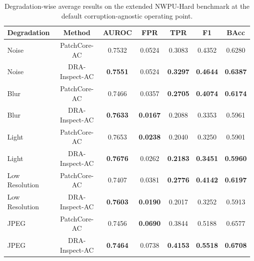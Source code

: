 \documentclass[remotesensing,article,submit,pdftex,moreauthors]{Definitions/mdpi}
\begin{document}
\begin{table}[!htbp]
\caption{Degradation-wise average results on the extended NWPU-Hard benchmark at the default corruption-agnostic operating point.}
\label{tab:nwpu-degradation-wise-appendix}
\centering
\scriptsize
\setlength{\tabcolsep}{3.5pt}
\begin{tabular}{lcccccc}
\hline
Degradation & Method & AUROC & FPR & TPR & F1 & BAcc \\
\hline
Noise & PatchCore-AC & 0.7532 & 0.0524 & 0.3083 & 0.4352 & 0.6280 \\
Noise & DRA-Inspect-AC & \textbf{0.7551} & 0.0524 & \textbf{0.3297} & \textbf{0.4644} & \textbf{0.6387} \\
Blur & PatchCore-AC & 0.7466 & 0.0357 & \textbf{0.2705} & \textbf{0.4074} & \textbf{0.6174} \\
Blur & DRA-Inspect-AC & \textbf{0.7633} & \textbf{0.0167} & 0.2088 & 0.3353 & 0.5961 \\
Light & PatchCore-AC & 0.7653 & \textbf{0.0238} & 0.2040 & 0.3250 & 0.5901 \\
Light & DRA-Inspect-AC & \textbf{0.7676} & 0.0262 & \textbf{0.2183} & \textbf{0.3451} & \textbf{0.5960} \\
Low Resolution & PatchCore-AC & 0.7407 & 0.0381 & \textbf{0.2776} & \textbf{0.4142} & \textbf{0.6197} \\
Low Resolution & DRA-Inspect-AC & \textbf{0.7603} & \textbf{0.0190} & 0.2017 & 0.3252 & 0.5913 \\
JPEG & PatchCore-AC & 0.7456 & \textbf{0.0690} & 0.3844 & 0.5188 & 0.6577 \\
JPEG & DRA-Inspect-AC & \textbf{0.7464} & 0.0738 & \textbf{0.4153} & \textbf{0.5518} & \textbf{0.6708} \\
\hline
\end{tabular}
\end{table}



\end{document}
